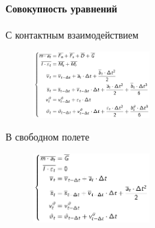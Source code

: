 \documentclass[c]{beamer}  %
\begin{document}
\begin{frame}
\frametitle{\insertsection} 
\framesubtitle{Совокупность уравнений}
С контактным взаимодействием
\begin{figure}[h!]
	\centering
	\includegraphics[width=0.4\textwidth]{ur_with}
\end{figure} 
В свободном полете
\begin{figure}[h!]
	\centering
	\includegraphics[width=0.4\textwidth]{ur_without}
\end{figure} 


\end{frame}
\end{document}

